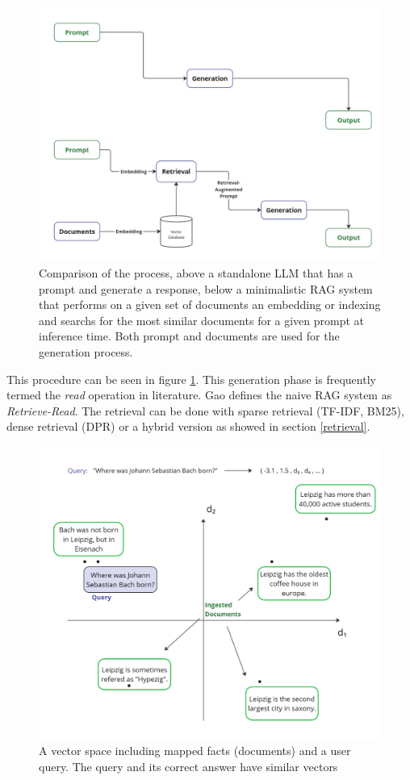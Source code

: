\begin{figure}[h!]
    \centering
    \includegraphics[width=\textwidth]{images/LLM-vs-RAG.pdf}
    \caption{Comparison of the process, above a standalone LLM that has a prompt and generate a response, below a minimalistic RAG system that performs on a given set of documents an embedding or indexing and searchs for the most similar documents for a given prompt at inference time. Both prompt and documents are used for the generation process.}
    \label{fig:naive_rag}
\end{figure}

This procedure can be seen in figure \ref{fig:naive_rag}. This generation phase is frequently termed the \textit{read} operation in literature. Gao \cite{Gao.18.12.2023} defines the naive RAG system as \textit{Retrieve-Read}. The retrieval can be done with sparse retrieval (TF-IDF, BM25), dense retrieval (DPR) or a hybrid version as showed in section \ref{retrieval}. 

\begin{figure}[h!]
    \centering
    \includegraphics[width=\textwidth]{images/VectorDB.pdf}
    \caption{A vector space including mapped facts (documents) and a user query. The query and its correct answer have similar vectors}
    \label{fig:vectorDB}
\end{figure}


